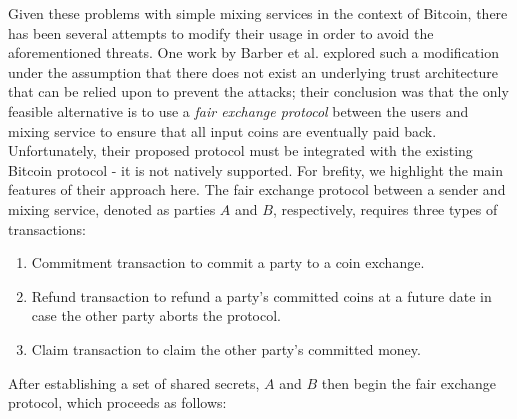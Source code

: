 Given these problems with simple mixing services in the context of Bitcoin, there has been several attempts to modify their usage in order to avoid the aforementioned threats. One work by Barber et al. \cite{BetterToBitter} explored such a modification under the assumption that there does not exist an underlying trust architecture that can be relied upon to prevent the attacks; their conclusion was that the only feasible alternative is to use a \emph{fair exchange protocol} between the users and mixing service to ensure that all input coins are eventually paid back. Unfortunately, their proposed protocol must be integrated with the existing Bitcoin protocol - it is not natively supported. For brefity, we highlight the main features of their approach here. The fair exchange protocol between a sender and mixing service, denoted as parties $A$ and $B$, respectively, requires three types of transactions:
\begin{enumerate}
	\item Commitment transaction to commit a party to a coin exchange.
	\item Refund transaction to refund a party's committed coins at a future date in case the other party aborts the protocol.
	\item Claim transaction to claim the other party's committed money. 
\end{enumerate}
After establishing a set of shared secrets, $A$ and $B$ then begin the fair exchange protocol, which proceeds as follows:
